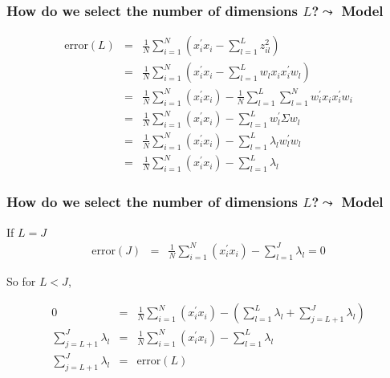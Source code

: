 \begin{frame}[fragile]
\frametitle{How do we select the number of dimensions $L$?$\leadsto$ \alert{Model}}
\begin{small}
\begin{eqnarray}
\text{error}(L) & = & \frac{1}{N} \sum_{i=1}^{N} \left({x}_{i}^{'}{x}_{i} - \sum_{l=1}^{L} z_{il}^{2} \right)\nonumber  \\
& = & \frac{1}{N} \sum_{i=1}^{N} \left({x}_{i}^{'}{x}_{i} - \sum_{l=1}^{L} {w}_{l} {x}_{i} {x}_{i}^{'}{w}_{l} \right) \nonumber  \\
& = & \frac{1}{N} \sum_{i=1}^{N} \left({x}_{i}^{'}{x}_{i}\right)  - \frac{1}{N} \sum_{l=1}^{L} \sum_{l=1}^{N} {w}_{i}^{'}{x}_{i} {x}_{i}^{'} {w}_{i} \nonumber  \\
& = & \frac{1}{N} \sum_{i=1}^{N} \left({x}_{i}^{'}{x}_{i}\right)  - \sum_{l=1}^{L} {w}_{l}^{'} {\Sigma} {w}_{l}  \nonumber  \\
& = & \frac{1}{N} \sum_{i=1}^{N} \left({x}_{i}^{'}{x}_{i}\right) - \sum_{l=1}^{L} \lambda_{l} {w}_{l}^{'}{w}_{l} \nonumber   \\
& = & \frac{1}{N} \sum_{i=1}^{N} \left({x}_{i}^{'}{x}_{i}\right) - \sum_{l=1}^{L} \lambda_{l} \nonumber  
\end{eqnarray}
\end{small}
\end{frame}


\begin{frame}[fragile]
\frametitle{How do we select the number of dimensions $L$?$\leadsto$ \alert{Model}}


If $L = J$  
\begin{eqnarray}
\text{error}(J) & = & \frac{1}{N} \sum_{i=1}^{N} \left({x}_{i}^{'}{x}_{i}\right) - \sum_{l=1}^{J} \lambda_{l} = 0 \nonumber   
\end{eqnarray}

So for $L < J$, 

\begin{eqnarray}
0  & = & \frac{1}{N} \sum_{i=1}^{N} \left({x}_{i}^{'}{x}_{i}\right) - (\sum_{l=1}^{L} \lambda_{l} + \sum_{j=L+1}^{J} \lambda_{l} ) \nonumber \\  
\sum_{j=L+1}^{J} \lambda_{l}  & = & \frac{1}{N} \sum_{i=1}^{N} \left({x}_{i}^{'}{x}_{i}\right) - \sum_{l=1}^{L} \lambda_{l} \nonumber \\  
\sum_{j=L+1}^{J} \lambda_{l}  & = & \text{error}(L) \nonumber 
\end{eqnarray}


\end{frame}


